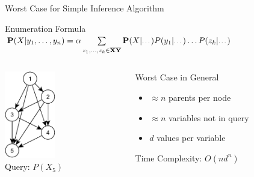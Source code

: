 \documentclass[12pt]{beamer}
\begin{document}
\begin{frame}{Worst Case for Simple Inference Algorithm}
	\begin{block}{Enumeration Formula}
		$
		\mathbf{P}(X|y_{1},\ldots,y_{n}) = 
		\alpha\sum\limits_{z_{1},\ldots,z_{k} \in \mathbf{\overline{XY}}}
		          {\mathbf{P}(X|\mbox{\scriptsize\ldots})
		           P(y_{1}|\mbox{\scriptsize\ldots})
		           \ldots
		           P(z_{k}|\mbox{\scriptsize\ldots})}
		$
	\end{block}
	\pause
	\begin{columns}
		\begin{column}{1.5in}
			\begin{center}
				\includegraphics[height=1.5in]{fully_connected_net}
				\\
				\smallskip
				Query: $P(X_{5})$
			\end{center}
		\end{column}
		\pause
		\begin{column}{2.5in}
			\begin{block}{Worst Case in General}
				\begin{itemize}
					\item $\approx n$ parents per node
					\item $\approx n$ variables not in query
					\item $d$ values per variable
				\end{itemize}
				Time Complexity: \pause $O(nd^{n})$
			\end{block}
		\end{column}
	\end{columns}
\end{frame}
\end{document}
